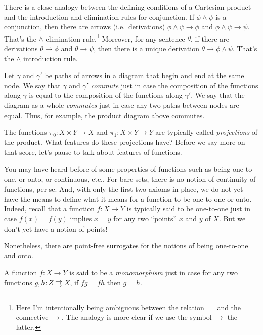 \begin{disc} There is a close analogy between the defining conditions
  of a Cartesian product and the introduction and elimination rules
  for conjunction.  If $\phi\wedge\psi$ is a conjunction, then there
  are arrows (i.e.\ derivations) $\phi\wedge\psi\to \phi$ and
  $\phi\wedge\psi\to \psi$.  That's the $\wedge$ elimination
  rule.\footnote{Here I'm intentionally being ambiguous between the
    relation $\vdash$ and the connective $\to$.  The analogy is more
    clear if we use the symbol $\to$ the latter.}  Moreover, for any
  sentence $\theta$, if there are derivations $\theta\to\phi$ and
  $\theta\to\psi$, then there is a unique derivation
  $\theta\to\phi\wedge \psi$.  That's the $\wedge$ introduction rule.
\end{disc}

\begin{defn} Let $\gamma$ and $\gamma '$ be paths of arrows in a
  diagram that begin and end at the same node.  We say that $\gamma$
  and $\gamma '$ \emph{commute} just in case the composition of the
  functions along $\gamma$ is equal to the composition of the
  functions along $\gamma '$.  We say that the diagram as a whole
  \emph{commutes} just in case any two paths between nodes are equal.
  Thus, for example, the product diagram above commutes. \end{defn}

The functions $\pi _0:X\times Y\to X$ and $\pi _1:X\times Y\to Y$ are
typically called \emph{projections} of the product.  What features do
these projections have?  Before we say more on that score, let's pause
to talk about features of functions.

You may have heard before of some properties of functions such as
being one-to-one, or onto, or continuous, etc..  For bare sets, there
is no notion of continuity of functions, per se.  And, with only the
first two axioms in place, we do not yet have the means to define what
it means for a function to be one-to-one or onto.  Indeed, recall that
a function $f:X\to Y$ is typically said to be one-to-one just in case
$f(x)=f(y)$ implies $x=y$ for any two ``points'' $x$ and $y$ of $X$.
But we don't yet have a notion of points!

Nonetheless, there are point-free surrogates for the notions of being
one-to-one and onto.

\begin{defn} A function $f:X\to Y$ is said to be a \emph{monomorphism}
  just in case for any two functions $g,h:Z\rightrightarrows X$, if
  $fg=fh$ then $g=h$.  \end{defn}

